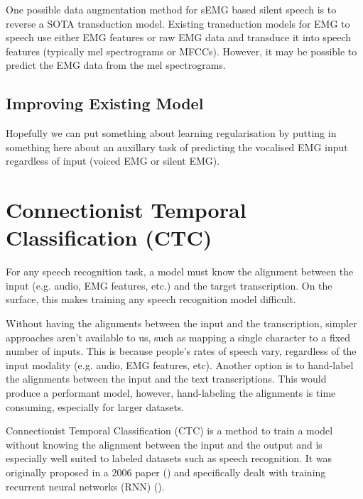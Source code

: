 One possible data augmentation method for sEMG based silent speech is to
reverse a SOTA transduction model. Existing transduction models for
EMG to speech use either EMG features or raw EMG data and transduce
it into speech features (typically mel spectrograms or MFCCs). However,
it may be possible to predict the EMG data from the mel spectrograms.

\subsection{Improving Existing Model}

Hopefully we can put something about learning regularisation
by putting in something here about an auxillary task of predicting
the vocalised EMG input regardless of input (voiced EMG or silent EMG).

\section{Connectionist Temporal Classification (CTC)}

For any speech recognition task, a model must know the alignment
between the input (e.g. audio, EMG features, etc.) and the target
transcription. On the surface, this makes training any speech
recognition model difficult.

Without having the alignments between the input and the transcription,
simpler approaches aren't available to us, such as mapping a single
character to a fixed number of inputs. This is because people's rates
of speech vary, regardless of the input modality (e.g. audio, EMG features,
etc). Another option is to hand-label the alignments between the input
and the text transcriptions. This would produce a performant model, however,
hand-labeling the alignments is time consuming, especially for larger datasets.

Connectionist Temporal Classification (CTC) is a method to train a model
without knowing the alignment between the input and the output and is especially
well suited to labeled datasets such as speech recognition.
It was originally proposed in a 2006 paper (\cite{ctc_original}) and specifically
dealt with training recurrent neural networks (RNN) (\cite{rnn_fundamentals}).